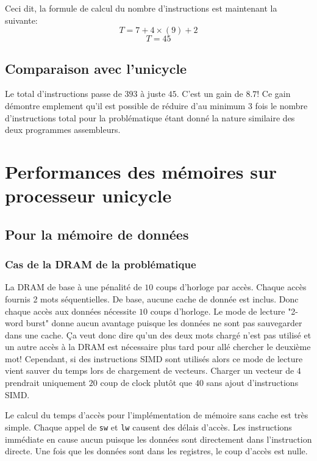 \documentclass[a11paper]{article}
\newcommand{\todo}[1]{\begin{color}{Red}\textbf{TODO:} #1\end{color}}
\begin{document}
Ceci dit, la formule de calcul du nombre d'instructions est maintenant la suivante:
$$
T = 7 + 4\times(9) + 2
$$
$$
T = 45
$$

\subsection{Comparaison avec l'unicycle}
Le total d'instructions passe de $393$ à juste $45$. C'est un gain de $8.7$! Ce
gain démontre emplement qu'il est possible de réduire d'au minimum $3$ fois le
nombre d'instructions total pour la problématique étant donné la nature
similaire des deux programmes assembleurs.






\section{Performances des mémoires sur processeur unicycle}
\subsection{Pour la mémoire de données}
\subsubsection{Cas de la DRAM de la problématique}

La DRAM de base à une pénalité de $10$ coups d'horloge par accès. Chaque accès
fournis 2 mots séquentielles. De base, aucune cache de donnée est inclus.
Donc chaque accès aux données nécessite $10$ coups d'horloge. Le mode de
lecture "2-word burst" donne aucun avantage puisque les données ne sont pas
sauvegarder dans une cache. Ça veut donc dire qu'un des deux mots chargé
n'est pas utilisé et un autre accès à la DRAM est nécessaire plus tard pour
allé chercher le deuxième mot! Cependant, si des instructions SIMD sont
utilisés alors ce mode de lecture vient sauver du temps lors de chargement de
vecteurs. Charger un vecteur de $4$ prendrait uniquement $20$ coup de clock
plutôt que $40$ sans ajout d'instructions SIMD.

Le calcul du temps d'accès pour l'implémentation de mémoire sans cache est très
simple. Chaque appel de \verb|sw| et \verb|lw| causent des délais d'accès.
Les instructions immédiate en cause aucun puisque les données sont directement
dans l'instruction directe. Une fois que les données sont dans les registres,
le coup d'accès est nulle.
\end{document}
